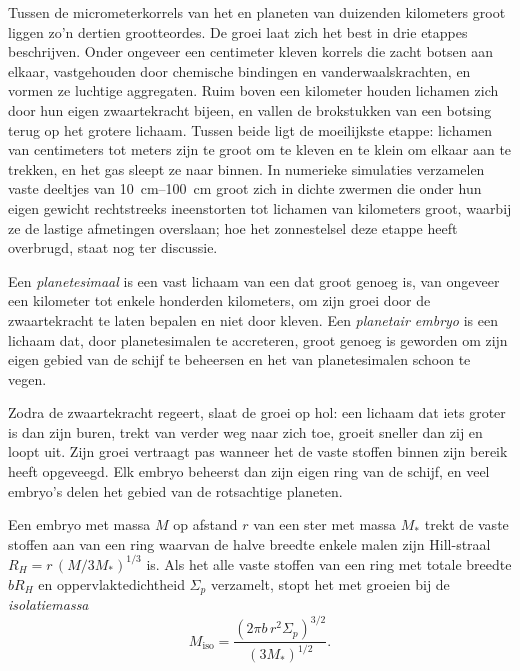 Tussen de micrometerkorrels van het  en planeten van duizenden
kilometers groot liggen zo'n dertien grootteordes. De groei laat zich
het best in drie etappes beschrijven. Onder ongeveer een centimeter kleven korrels die zacht
botsen aan elkaar, vastgehouden door chemische bindingen en vanderwaalskrachten, en vormen ze luchtige
aggregaten. Ruim boven een kilometer houden lichamen zich door hun eigen zwaartekracht bijeen,
en vallen de brokstukken van een botsing terug op het grotere lichaam. Tussen beide
ligt de moeilijkste etappe: lichamen van centimeters tot meters zijn te groot om te kleven
en te klein om elkaar aan te trekken, en het gas sleept ze naar binnen. In
numerieke simulaties verzamelen vaste deeltjes van \qtyrange{10}{100}{cm} groot zich in dichte
zwermen die onder hun eigen gewicht rechtstreeks ineenstorten tot lichamen van kilometers
groot, waarbij ze de lastige afmetingen overslaan; hoe het zonnestelsel deze etappe heeft overbrugd,
staat nog ter discussie.

\begin{definition}
\label{def:b2:planet-formation-meteorites:planetesimal}
Een \emph{planetesimaal} is een vast lichaam van een  dat groot genoeg is, van ongeveer een kilometer tot enkele honderden kilometers,
om zijn groei door de zwaartekracht te laten bepalen en niet door kleven. Een
\emph{planetair embryo} is een lichaam dat, door
planetesimalen te accreteren, groot genoeg is geworden om zijn eigen gebied van de schijf te beheersen en
het van planetesimalen schoon te vegen.
\end{definition}

Zodra de zwaartekracht regeert, slaat de groei op hol: een lichaam dat iets groter is dan zijn
buren, trekt  van verder weg naar zich toe, groeit sneller
dan zij en loopt uit. Zijn groei vertraagt pas wanneer het de vaste stoffen
binnen zijn bereik heeft opgeveegd. Elk embryo beheerst dan zijn eigen ring van de schijf,
en veel embryo's delen het gebied van de rotsachtige planeten.

\begin{proposition}[Isolatiemassa]\label{prop:b2:planet-formation-meteorites:isolation}
Een embryo met massa $M$ op afstand $r$ van een ster met massa $M_*$ trekt de
vaste stoffen aan van een ring waarvan de halve breedte enkele malen zijn Hill-straal
$R_H = r\,(M/3M_*)^{1/3}$ is. Als het alle vaste stoffen van een ring met totale
breedte $bR_H$ en oppervlaktedichtheid $\Sigma_p$ verzamelt, stopt het met groeien bij de
\emph{isolatiemassa}
\[
  M_{\mathrm{iso}} = \frac{(2\pi b\, r^2 \Sigma_p)^{3/2}}{(3M_*)^{1/2}} .
\]
\end{proposition}

